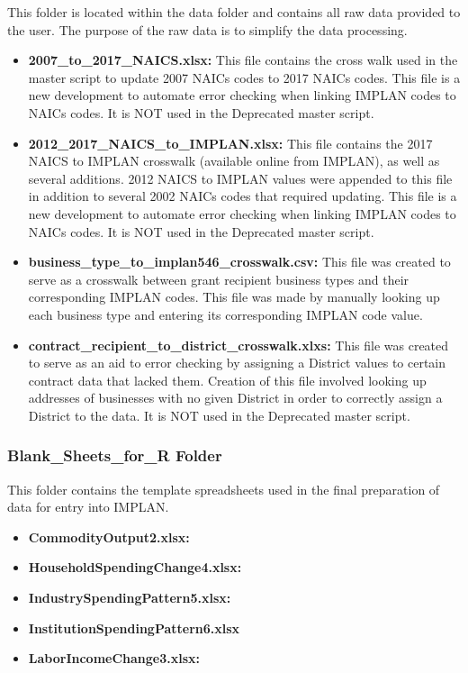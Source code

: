 \documentclass[
]{book}
\providecommand{\tightlist}{%
  \setlength{\itemsep}{0pt}\setlength{\parskip}{0pt}}
\begin{document}
This folder is located within the data folder and contains all raw data provided to the user. The purpose of the raw data is to simplify the data processing.

\begin{itemize}
\tightlist
\item
  \textbf{2007\_to\_2017\_NAICS.xlsx:} This file contains the cross walk used in the master script to update 2007 NAICs codes to 2017 NAICs codes. This file is a new development to automate error checking when linking IMPLAN codes to NAICs codes. It is NOT used in the Deprecated master script.
\item
  \textbf{2012\_2017\_NAICS\_to\_IMPLAN.xlsx:} This file contains the 2017 NAICS to IMPLAN crosswalk (available online from IMPLAN), as well as several additions. 2012 NAICS to IMPLAN values were appended to this file in addition to several 2002 NAICs codes that required updating. This file is a new development to automate error checking when linking IMPLAN codes to NAICs codes. It is NOT used in the Deprecated master script.
\item
  \textbf{business\_type\_to\_implan546\_crosswalk.csv:} This file was created to serve as a crosswalk between grant recipient business types and their corresponding IMPLAN codes. This file was made by manually looking up each business type and entering its corresponding IMPLAN code value.
\item
  \textbf{contract\_recipient\_to\_district\_crosswalk.xlxs:} This file was created to serve as an aid to error checking by assigning a District values to certain contract data that lacked them. Creation of this file involved looking up addresses of businesses with no given District in order to correctly assign a District to the data. It is NOT used in the Deprecated master script.
\end{itemize}

\hypertarget{blank_sheets_for_r-folder}{%
\subsubsection{Blank\_Sheets\_for\_R Folder}\label{blank_sheets_for_r-folder}}

This folder contains the template spreadsheets used in the final preparation of data for entry into IMPLAN.

\begin{itemize}
\tightlist
\item
  \textbf{CommodityOutput2.xlsx:}
\item
  \textbf{HouseholdSpendingChange4.xlsx:}
\item
  \textbf{IndustrySpendingPattern5.xlsx:}
\item
  \textbf{InstitutionSpendingPattern6.xlsx}
\item
  \textbf{LaborIncomeChange3.xlsx:}
\end{itemize}
\end{document}
